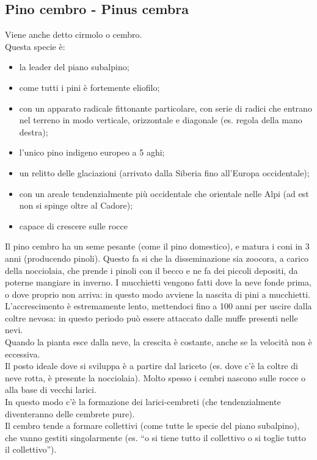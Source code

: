 \subsection{Pino cembro - Pinus cembra}
Viene anche detto cirmolo o cembro.\\
Questa specie è:
\begin{itemize}[nosep]
    \item la leader del piano subalpino;
    \item come tutti i pini è fortemente eliofilo;
    \item con un apparato radicale fittonante particolare, con serie di radici che entrano nel terreno in modo verticale, orizzontale e diagonale (es. regola della mano destra);
    \item l'unico pino indigeno europeo a 5 aghi;
    \item un relitto delle glaciazioni (arrivato dalla Siberia fino all'Europa occidentale);
    \item con un areale tendenzialmente più occidentale che orientale nelle Alpi (ad est non si spinge oltre al Cadore);
    \item capace di crescere sulle rocce
\end{itemize}
Il pino cembro ha un seme pesante (come il pino domestico), e matura i coni in 3 anni (producendo pinoli). Questo fa si che la disseminazione sia zoocora, a carico della nocciolaia, che prende i pinoli con il becco e ne fa dei piccoli depositi, da poterne mangiare in inverno. I mucchietti vengono fatti dove la neve fonde prima, o dove proprio non arriva: in questo modo avviene la nascita di pini a mucchietti.\\
L'accrescimento è estremamente lento, mettendoci fino a 100 anni per uscire dalla coltre nevosa: in questo periodo può essere attaccato dalle muffe presenti nelle nevi.\\
Quando la pianta esce dalla neve, la crescita è costante, anche se la velocità non è eccessiva.\\
Il posto ideale dove si sviluppa è a partire dal lariceto (es. dove c'è la coltre di neve rotta, è presente la nocciolaia). Molto spesso i cembri nascono sulle rocce o alla base di vecchi larici.\\
In questo modo c'è la formazione dei larici-cembreti (che tendenzialmente diventeranno delle cembrete pure).\\
Il cembro tende a formare collettivi (come tutte le specie del piano subalpino), che vanno gestiti singolarmente (es. ``o si tiene tutto il collettivo o si toglie tutto il collettivo'').\\
